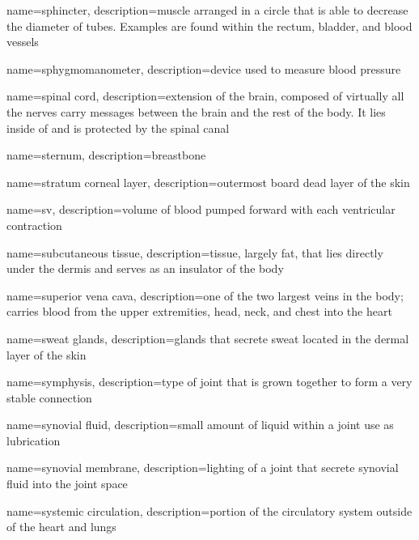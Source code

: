\documentclass[../../EMT-169.tex]{subfiles}
\begin{document}
	{
		name=sphincter,
		description={muscle arranged in  a circle that is able to decrease the diameter of tubes. Examples are found within the rectum, bladder, and blood vessels}
	}
	
	{
		name=sphygmomanometer,
		description={device used to measure blood pressure}
	}
	
	{
		name=spinal cord,
		description={extension of the brain, composed of virtually all the nerves carry messages between the brain and the rest of the body. It lies inside of and is protected by the spinal canal}
	}
	
	{
		name=sternum,
		description={breastbone}
	}
	
	{
		name=stratum corneal layer,
		description={outermost board dead layer of the skin}
	}
	
	{
		name=\acrlong{sv},
		description={volume of blood pumped forward with each ventricular contraction}
	}
	
	{
		name=subcutaneous tissue,
		description={tissue, largely fat, that lies directly under the dermis and serves as an insulator of the body}
	}
	
	{
		name=superior vena cava,
		description={one of the two largest veins in the body; carries blood from the upper extremities, head, neck, and chest into the heart}
	}
	
	{
		name=sweat glands,
		description={glands that secrete sweat located in the dermal layer of the skin}
	}
	
	{
		name=symphysis,
		description={type of joint that is grown together to form a very stable connection}
	}
	
	{
		name=synovial fluid,
		description={small amount of liquid within a joint use as lubrication}
	}
	
	{
		name=synovial membrane,
		description={lighting of a joint that secrete synovial fluid into the joint space}
	}
	
	{
		name=systemic circulation,
		description={portion of the circulatory system outside of the heart and lungs}
	}
	
\end{document}
